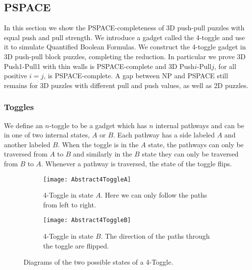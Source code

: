 \subsection{PSPACE}
\label{3DPSPACE}
In this section we show the PSPACE-completeness of 3D push-pull puzzles with equal push and pull strength. We introduce a gadget called the 4-toggle and use it to simulate Quantified Boolean Formulas\cite{NPBook}. We construct the 4-toggle gadget in 3D push-pull block puzzles, completing the reduction. In particular we prove 3D Push1-Pull1 with thin walls is PSPACE-complete and 3D Push$i$-Pull$j$, for all positive $i=j$, is PSPACE-complete. A gap between NP and PSPACE still remains for 3D puzzles with different pull and push values, as well as 2D puzzles. 


\subsubsection{Toggles}
We define an $n$-toggle to be a gadget which has $n$ internal pathways and can be in one of two internal states, $A$ or $B$. Each pathway has a side labeled $A$ and another labeled $B$. When the toggle is in the $A$ state, the pathways can only be traversed from $A$ to $B$ and similarly in the $B$ state they can only be traversed from $B$ to $A$. Whenever a pathway is traversed, the state of the toggle flips.

\begin{figure}[!ht]
\centering
\begin{subfigure}[t]{0.3\textwidth}
  \centering
    \texttt{[image: Abstract4ToggleA]}
    \caption{4-Toggle in state $A$. Here we can only follow the paths from left to right.}
    \label{fig:Abstract4ToggleA}
\end{subfigure}
\hspace{25mm}
\begin{subfigure}[t]{0.3\textwidth}
  \centering
    \texttt{[image: Abstract4ToggleB]}
    \caption{4-Toggle in state $B$. The direction of the paths through the toggle are flipped.}
    \label{fig:Abstract4ToggleB}
\end{subfigure}
\caption{Diagrams of the two possible states of a 4-Toggle.}
\end{figure}


